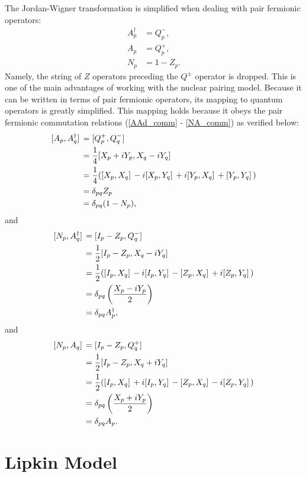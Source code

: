 \documentclass[10pt]{article}
\begin{document}
The Jordan-Wigner transformation is simplified when dealing with pair fermionic operators:
\begin{align}
A^\dagger_p&=Q^-_p,
\\
A_p&=Q^+_p,
\\
N_p&=1-Z_p
.\end{align}
Namely, the string of $Z$ operators preceding the $Q^\pm$ operator is dropped. This is one of the main advantages of working with the nuclear pairing model. Because it can be written in terms of pair fermionic operators, its mapping to quantum operators is greatly simplified. This mapping holds because it obeys the pair fermionic commutation relations (\ref{AAd_comm} - \ref{NA_comm}) as verified below:
\begin{align}
\comm*{A_p}{A^\dagger_q}
&=
\comm*{Q^+_p}{Q^-_q}
\nonumber
\\
&=
\frac{1}{4}\comm*{X_p+iY_p}{X_q-iY_q}
\nonumber
\\
&=
\frac{1}{4}(\comm*{X_p}{X_q}-i\comm*{X_p}{Y_q}+i\comm*{Y_p}{X_q}+\comm*{Y_p}{Y_q})
\nonumber
\\
&=
\delta_{pq}Z_p
\nonumber
\\
&=
\delta_{pq}(1-N_p),
\end{align}
and
\begin{align}
\comm*{N_p}{A^\dagger_q}
&=
\comm*{I_p-Z_p}{Q^-_q}
\nonumber
\\
&=
\frac{1}{2}\comm*{I_p-Z_p}{X_q-iY_q}
\nonumber
\\
&=
\frac{1}{2}(\comm*{I_p}{X_q}-i\comm*{I_p}{Y_q}-\comm*{Z_p}{X_q}+i\comm*{Z_p}{Y_q})
\nonumber
\\
&=
\delta_{pq}\left(\frac{X_p-iY_p}{2}\right)
\nonumber
\\
&=
\delta_{pq}A^\dagger_p,
\end{align}
and
\begin{align}
\comm*{N_p}{A_q}
&=
\comm*{I_p-Z_p}{Q^+_q}
\nonumber
\\
&=
\frac{1}{2}\comm*{I_p-Z_p}{X_q+iY_q}
\nonumber
\\
&=
\frac{1}{2}(\comm*{I_p}{X_q}+i\comm*{I_p}{Y_q}-\comm*{Z_p}{X_q}-i\comm*{Z_p}{Y_q})
\nonumber
\\
&=
\delta_{pq}\left(\frac{X_p+iY_p}{2}\right)
\nonumber
\\
&=
\delta_{pq}A_p.
\end{align}

\chapter{Lipkin Model}
\label{chap:lipkin_model}
\end{document}
